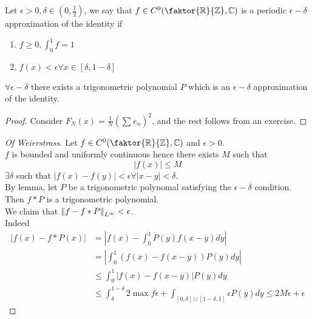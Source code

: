 \documentclass[../main.tex]{subfiles}
\begin{document}
\begin{defn}
	Let $\epsilon>0, \delta \in ( 0,\frac{1}{2}) $, we say that $f \in C^{0}(  \faktor { \mathbb{R}} { \mathbb{Z}} , \mathbb{C}) $ is a periodic $\epsilon-\delta$ approximation of the identity if
	\begin{enumerate}
	\item $f \geq 0, \int_{0  }^{1  }f = 1$ 
	\item $f( x) < \epsilon \forall x \in [ \delta, 1- \delta] $ 
	\end{enumerate}
	
\end{defn}
\begin{lemma}
$\forall \epsilon- \delta$ there exists a trigonometric polynomial $P$ which is an $\epsilon-\delta$ approximation of the identity.
\end{lemma}
\begin{proof}
Consider $F_N( x) = \frac{1}{N} ( \sum_{}^{ } e_n) ^{2}$, and the rest follows from an exercise.
\end{proof}
\begin{proof}[Of Weierstrass]
Let $f\in C^{0}(  \faktor { \mathbb{R}} { \mathbb{Z}} , \mathbb{C}) $ and $\epsilon>0$.\\
$f$ is bounded and uniformly continuous hence there exists $M$ such that
\[ 
|f( x) | \leq M
\]
$\exists \delta$ such that $ |f( x) - f( y) | < \epsilon \forall |x-y| < \delta$.\\
By lemma, let $P$ be a trigonometric polynomal satisfying the $\epsilon-\delta$ condition.\\
Then $f \ast P$ is a trigonometric polynomial.\\
We claim that $ \left\lVert f- f\ast P\right\rVert _{L^{ \infty }} < \epsilon$.\\
Indeed
\begin{align*}
	|f( x) - f\ast P( x) | &= |f( x) - \int_{ 0 }^{  1}P( y)  f( x-y) dy|\\
	&= | \int_{ 0 }^{ 1 } ( f( x) - f( x-y) ) P( y) dy|\\
	&\leq  \int_{ 0 }^{ 1 } |f( x) - f( x-y) | P( y) dy\\
	& \leq  \int_{ \delta }^{ 1- \delta } 2 \max f \epsilon + \int_{ [ 0,\delta] \cup [ 1- \delta, 1]  }^{  } \epsilon P( y) dy \leq  2 M \epsilon + \epsilon
\end{align*}
		
\end{proof}
\end{document}
